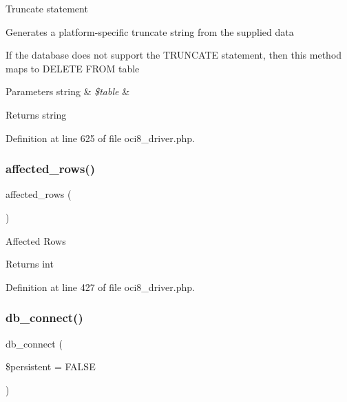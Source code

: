 Truncate statement

Generates a platform-\/specific truncate string from the supplied data

If the database does not support the T\+R\+U\+N\+C\+A\+TE statement, then this method maps to \textquotesingle{}D\+E\+L\+E\+TE F\+R\+OM table\textquotesingle{}


\begin{DoxyParams}[1]{Parameters}
string & {\em \$table} & \\
\hline
\end{DoxyParams}
\begin{DoxyReturn}{Returns}
string 
\end{DoxyReturn}


Definition at line 625 of file oci8\+\_\+driver.\+php.

\mbox{\label{class_c_i___d_b__oci8__driver_a77248aaad33eb132c04cc4aa3f4bc8cb}} 
\subsubsection{\texorpdfstring{affected\_rows()}{affected\_rows()}}
{\footnotesize\ttfamily affected\+\_\+rows (\begin{DoxyParamCaption}{ }\end{DoxyParamCaption})}

Affected Rows

\begin{DoxyReturn}{Returns}
int 
\end{DoxyReturn}


Definition at line 427 of file oci8\+\_\+driver.\+php.

\mbox{\label{class_c_i___d_b__oci8__driver_a52bf595e79e96cc0a7c907a9b45aeb4d}} 
\subsubsection{\texorpdfstring{db\_connect()}{db\_connect()}}
{\footnotesize\ttfamily db\+\_\+connect (\begin{DoxyParamCaption}\item[{}]{\$persistent = {\ttfamily FALSE} }\end{DoxyParamCaption})}

